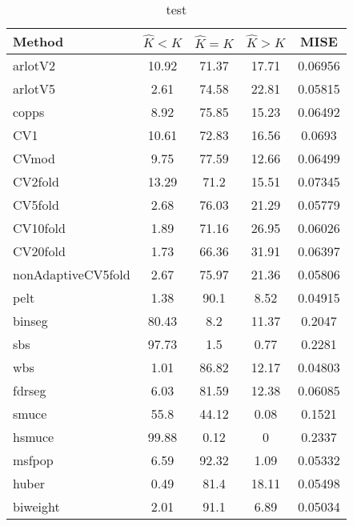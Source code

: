 \begin{table}[ht]
\centering
\begin{tabular}{l|cccc}
  \hline
Method & $\hat{K} < K$ & $\hat{K} = K$ & $\hat{K} > K$ & MISE \\ 
  \hline
arlotV2 & 10.92 & 71.37 & 17.71 & 0.06956 \\ 
  arlotV5 &  2.61 & 74.58 & 22.81 & 0.05815 \\ 
  copps &  8.92 & 75.85 & 15.23 & 0.06492 \\ 
  CV1 & 10.61 & 72.83 & 16.56 & 0.0693 \\ 
  CVmod &  9.75 & 77.59 & 12.66 & 0.06499 \\ 
  CV2fold & 13.29 &  71.2 & 15.51 & 0.07345 \\ 
  CV5fold &  2.68 & 76.03 & 21.29 & 0.05779 \\ 
  CV10fold &  1.89 & 71.16 & 26.95 & 0.06026 \\ 
  CV20fold &  1.73 & 66.36 & 31.91 & 0.06397 \\ 
  nonAdaptiveCV5fold &  2.67 & 75.97 & 21.36 & 0.05806 \\ 
  pelt &  1.38 &  90.1 &  8.52 & 0.04915 \\ 
  binseg & 80.43 &   8.2 & 11.37 & 0.2047 \\ 
  sbs & 97.73 &   1.5 &  0.77 & 0.2281 \\ 
  wbs &  1.01 & 86.82 & 12.17 & 0.04803 \\ 
  fdrseg &  6.03 & 81.59 & 12.38 & 0.06085 \\ 
  smuce &  55.8 & 44.12 &  0.08 & 0.1521 \\ 
  hsmuce & 99.88 &  0.12 &     0 & 0.2337 \\ 
  msfpop &  6.59 & 92.32 &  1.09 & 0.05332 \\ 
  huber &  0.49 &  81.4 & 18.11 & 0.05498 \\ 
  biweight &  2.01 &  91.1 &  6.89 & 0.05034 \\ 
   \hline
\end{tabular}
\caption{test} 
\end{table}
